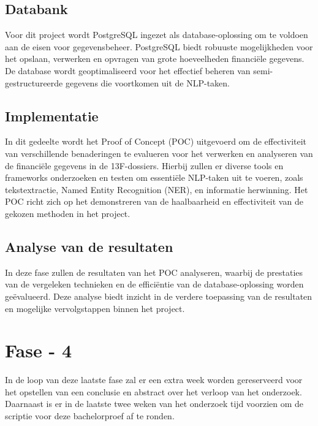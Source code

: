 \subsection{Databank}
Voor dit project wordt PostgreSQL ingezet als database-oplossing om te voldoen aan de eisen voor gegevensbeheer. PostgreSQL biedt robuuste mogelijkheden voor het opslaan, verwerken en opvragen van grote hoeveelheden financiële gegevens. De database wordt geoptimaliseerd voor het effectief beheren van semi-gestructureerde gegevens die voortkomen uit de NLP-taken.

\subsection{Implementatie}
In dit gedeelte wordt het Proof of Concept (POC) uitgevoerd om de effectiviteit van verschillende benaderingen te evalueren voor het verwerken en analyseren van de financiële gegevens in de 13F-dossiers. Hierbij zullen er diverse tools en frameworks onderzoeken en testen om essentiële NLP-taken uit te voeren, zoals tekstextractie, Named Entity Recognition (NER), en informatie herwinning. Het POC richt zich op het demonstreren van de haalbaarheid en effectiviteit van de gekozen methoden in het project.

\subsection{Analyse van de resultaten}
In deze fase zullen de resultaten van het POC analyseren, waarbij de prestaties van de vergeleken technieken en de efficiëntie van de database-oplossing worden geëvalueerd. Deze analyse biedt inzicht in de verdere toepassing van de resultaten en mogelijke vervolgstappen binnen het project. %

\section{Fase - 4}
In de loop van deze laatste fase zal er een extra week worden gereserveerd voor het opstellen van een conclusie en abstract over het verloop van het onderzoek. Daarnaast is er in de laatste twee weken van het onderzoek tijd voorzien om de scriptie voor deze bachelorproef af te ronden.